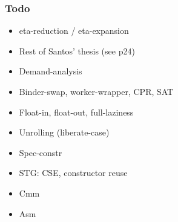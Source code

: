 \documentclass[aspectratio=169]{beamer}
\begin{document}
\begin{frame}
  \frametitle{Todo}

  \begin{itemize}
    \item eta-reduction / eta-expansion
    \item Rest of Santos' thesis (see p24)
    \item Demand-analysis
    \item Binder-swap, worker-wrapper, CPR, SAT
    \item Float-in, float-out, full-laziness
    \item Unrolling (liberate-case)
    \item Spec-constr
    \item STG: CSE, constructor reuse
    \item Cmm
    \item Asm
  \end{itemize}

\end{frame}
\end{document}
